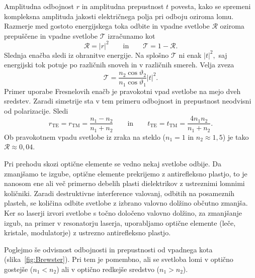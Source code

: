 Amplitudna odbojnost $r$ in amplitudna prepustnost $t$ povesta, kako se spremeni 
kompleksna amplituda jakosti električnega polja pri odboju oziroma lomu.
Razmerje med gostoto energijskega toka odbite in vpadne svetlobe $\mathcal{R}$ oziroma 
prepuščene in vpadne svetlobe $\mathcal{T}$ izračunamo kot 
\begin{equation}
\mathcal{R}=\left|r\right|^{2} \qquad \mathrm{in} \qquad \mathcal{T}=1-\mathcal{R}.
\end{equation}
Slednja enačba sledi iz ohranitve energije. Na splošno $\mathcal{T}$
ni enak $\left|t\right|^{2},$ saj energijski tok potuje po različnih
snoveh in v različnih smereh. Velja zveza
\begin{equation}
\mathcal{T}=\frac{n_{2}\cos\vartheta_{2}}{n_{1}\cos\vartheta_{1}}\left|t\right|^{2}.
\end{equation}
Primer uporabe Fresnelovih enačb je pravokotni vpad svetlobe na mejo dveh sredstev. 
Zaradi simetrije sta v tem primeru odbojnost in prepustnost neodvisni od polarizacije. Sledi
\begin{equation}
r_{\mathrm{TE}} = r_{\mathrm{TM}} = \frac{n_1-n_2}{n_1+n_2}
\qquad \mathrm{in} \qquad 
t_{\mathrm{TE}} = t_{\mathrm{TM}} = \frac{4n_1n_2}{n_1+n_2}. 
\end{equation}
Ob pravokotnem vpadu svetlobe iz zraka na steklo ($n_1 = 1$ in $n_2 \approx 1,5$) je tako
$\mathcal{R} \approx 0,04$.
\begin{remark}
Pri prehodu skozi optične elemente se vedno nekaj
svetlobe odbije. Da zmanjšamo te izgube, optične elemente
prekrijemo z antirefleksno plastjo, to je nanosom ene ali več primerno
debelih plasti dielektrikov z ustreznimi lomnimi količniki.
Zaradi destruktivne interference valovanj, odbitih na posameznih plasteh,
se količina odbite svetlobe z izbrano valovno dolžino občutno zmanjša. Ker so laserji
izvori svetlobe s točno določeno valovno dolžino, za zmanjšanje
izgub, na primer v resonatorju laserja, uporabljamo optične
elemente (leče, kristale, modulatorje) z ustrezno antirefleksno plastjo.
\end{remark}

Poglejmo še odvisnost odbojnosti in prepustnosti od vpadnega kota (slika~\ref{fig:Brewster}). 
Pri tem je pomembno, ali se svetloba lomi v optično gostejše ($n_1<n_2$) ali v optično
redkejše sredstvo ($n_1>n_2$). 


